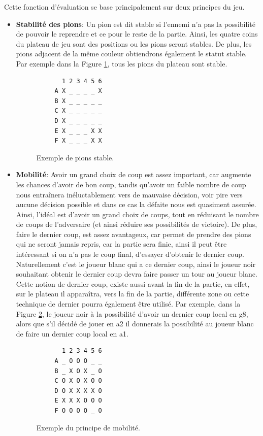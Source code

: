 \documentclass[10pt,a4paper]{article}
\begin{document}
 Cette fonction d'évaluation se base principalement sur deux principes du jeu.
  \begin{itemize}
  \item \textbf{Stabilité des pions}: Un pion est dit stable si l'ennemi n'a pas la possibilité de pouvoir le reprendre et ce pour le reste de la partie. Ainsi, les quatre coins du plateau de jeu sont des positions ou les pions seront stables. De plus, les pions adjacent de la même couleur obtiendrons également le statut stable. Par exemple dans la Figure \ref{fig:pion_stable}, tous les pions du plateau sont stable.
   \begin{figure}[H]    
    \centering
    \begin{BVerbatim}
       1 2 3 4 5 6
     A X _ _ _ _ X
     B X _ _ _ _ _
     C X _ _ _ _ _
     D X _ _ _ _ _
     E X _ _ _ X X
     F X _ _ _ X X 
    \end{BVerbatim}
    \caption {Exemple de pions stable.\label{fig:pion_stable}}
   \end{figure}

\item \textbf{Mobilité}: Avoir un grand choix de coup est assez important, car augmente les chances d'avoir de bon coup, tandis qu'avoir un faible nombre de coup nous entraînera inéluctablement vers de mauvaise décision, voir pire vers aucune décision possible et dans ce cas la défaite nous est quasiment assurée. Ainsi, l'idéal est d'avoir un grand choix de coups, tout en réduisant le nombre de coups de l'adversaire (et ainsi réduire ses possibilités de victoire).
  \newline
  De plus, faire le dernier coup, est assez avantageux, car permet de prendre des pions qui ne seront jamais repris, car la partie sera finie, ainsi il peut être intéressant si on n'a pas le coup final, d'essayer d'obtenir le dernier coup. Naturellement c'est le joueur blanc qui  a ce dernier coup, ainsi le joueur noir souhaitant obtenir le dernier coup devra faire passer un tour au joueur blanc.
  Cette notion de dernier coup, existe aussi avant la fin de la partie, en effet, sur le plateau il apparaîtra, vers la fin de la partie, différente zone ou cette technique de dernier pourra également être utilisé.
  Par exemple, dans la Figure \ref{fig:mobilité}, le joueur noir à la possibilité d'avoir un dernier coup local en g8, alors que s'il décidé de jouer en a2 il donnerais la possibilité au joueur blanc de faire un dernier coup local en a1.
  \begin{figure}[H]    
    \centering
    \begin{BVerbatim}
       1 2 3 4 5 6 
     A _ O O O _ _
     B _ X O X _ O
     C O X O X O O
     D O X X X X O
     E X X X O O O
     F O O O O _ O 
    \end{BVerbatim}
    \caption {Exemple du principe de mobilité.\label{fig:mobilité}}
  \end{figure}
    \end{itemize}
\end{document}
